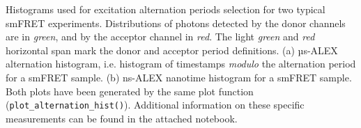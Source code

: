 \label{fig:altern_hist_double}
Histograms used for excitation alternation periods selection for two typical smFRET experiments. 
Distributions of photons detected by the donor channels are in \textit{green}, and by the acceptor channel in \textit{red}.
The light \textit{green} and \textit{red} horizontal span mark the donor and acceptor period definitions.
(a) µs-ALEX alternation histogram, i.e. histogram of timestamps \textit{modulo} the alternation period for a smFRET sample. 
(b) ns-ALEX nanotime histogram for a smFRET sample. Both plots have been generated by the same plot function (\verb|plot_alternation_hist()|). 
Additional information on these specific measurements can be found in the  attached notebook.